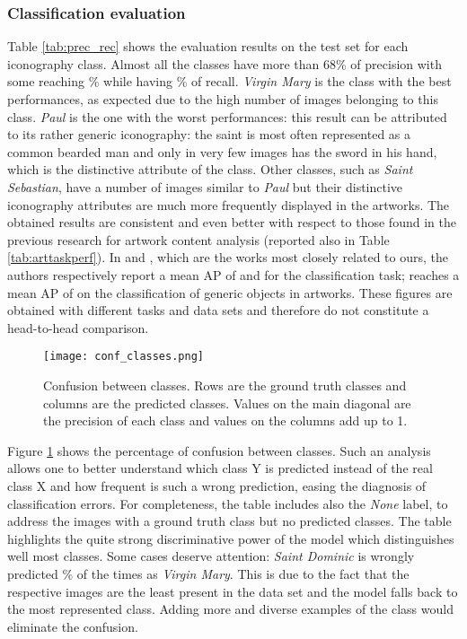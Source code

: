 \documentclass[acmlarge]{acmart}
\begin{document}
\subsubsection{Classification evaluation}
Table \ref{tab:prec_rec} shows the evaluation results on the test set for each iconography class. Almost all the classes have more than 68\% of precision with some reaching \% while having \% of recall.  \textit{Virgin Mary} is the class with the best performances, as expected due to  the high number of images belonging to this class. \textit{Paul} is the one with the worst performances: this result can be attributed to its rather generic iconography: the saint is most often represented as a common bearded man and only in very few images has the sword in his hand, which is the distinctive attribute of the class. Other classes, such as \textit{Saint Sebastian}, have a number of images  similar to \textit{Paul} but their distinctive iconography  attributes are much more  frequently displayed in the artworks. The obtained results are consistent and even better with respect to those found in the previous research for artwork content analysis (reported also in Table \ref{tab:arttaskperf}). In \cite{gonthier2018weakly} and \cite{gonthier2020multiple}, which are the works most closely related to ours, the authors  respectively report a mean AP of  and  for the classification task; \cite{crowley2016art} reaches a mean AP of  on the classification of generic objects in artworks. These figures are obtained with  different  tasks and data sets and therefore do not constitute a head-to-head comparison.

\begin{figure}[t]
    \centering
    \texttt{[image: conf\_classes.png]}
    \caption{Confusion between classes. Rows are the ground truth classes and columns are the predicted classes. Values on the main diagonal are the precision of each class and values on the columns  add up to 1.
    }
    \label{figure:conf_classes}
\end{figure}

Figure \ref{figure:conf_classes} shows the percentage of confusion between classes. Such an analysis allows one to better understand which class Y is predicted instead of the real class X and how frequent is such a wrong prediction, easing the diagnosis of classification errors.
For completeness, the table includes also the \textit{None} label, to address the images with a ground truth class but no predicted classes. The table highlights the quite strong discriminative power of the model which   distinguishes well most classes. Some  cases deserve attention:    \textit{Saint Dominic} is wrongly predicted \% of the times as \textit{Virgin Mary}. This is due to the fact that the respective images are the least present in the data set  and the model falls back to the most represented class. Adding more and diverse examples of the class would eliminate the confusion.
\end{document}
